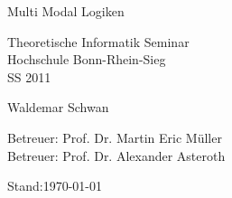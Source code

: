 
\begin{titlepage}
	
	\vspace*{2cm}
	
	\begin{center}
		\begin{Huge}
			Multi Modal Logiken
		\end{Huge}
	\end{center}
	
	\vspace*{2cm}
	
	\begin{center}
		\begin{Large}
			Theoretische Informatik Seminar\\
			Hochschule Bonn-Rhein-Sieg\\
			SS 2011
		\end{Large}			
	\end{center}

	\vspace*{4cm}
	
	\begin{center}
		\begin{Large}
			Waldemar Schwan 
		\end{Large}			
	\end{center}
	\vspace*{5cm}
	\begin{large}
		Betreuer: Prof. Dr. Martin Eric Müller \\
		Betreuer: Prof. Dr. Alexander Asteroth 
	\end{large}
	\vspace*{1cm}
	Stand:\today
\end{titlepage}